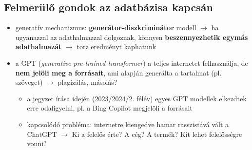 \documentclass[a4paper, 11pt]{article}
\begin{document}
\subsection{Felmerülő gondok az adatbázisa kapcsán}

\begin{itemize}
	\item generatív mechanizmus: \textbf{generátor-diszkriminátor} modell $\to$ ha ugyanazzal az adathalmazzal dolgoznak, könnyen \textbf{beszennyezhetik egymás adathalmazát} $\to$ torz eredményt kaphatunk
	\item a GPT (\textit{generative pre-trained transformer}) a teljes internetet felhasználja, de \textbf{nem jelöli meg a forrásait}, ami alapján generálta a tartalmat (pl. szöveget) $\to$ plagizálás, másolás?
	\begin{itemize}
		\item a jegyzet írása idején (2023/2024/2. félév) egyes GPT modellek elkezdtek erre odafigyelni, pl. a Bing Copilot megjelöli a forrásait
		\item kapcsolódó probléma: internetre kiengedve hamar rasszistává vált a ChatGPT $\to$ Ki a felelős érte? A cég? A termék? Kit lehet felelősségre vonni?
	\end{itemize}
\end{itemize}
\end{document}

